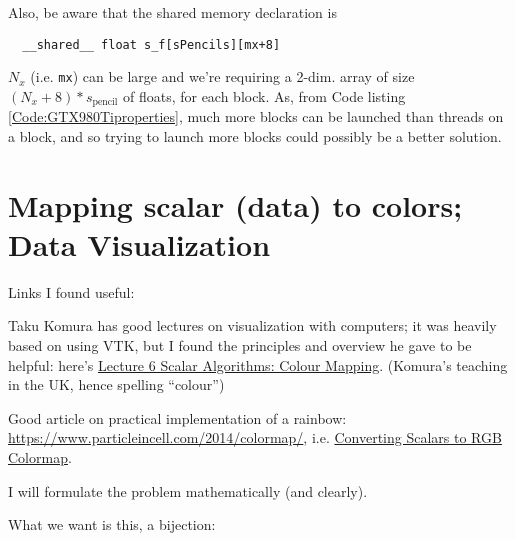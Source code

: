 \documentclass[10pt]{amsart}
\begin{document}
\begin{multicols*}{2}
Also, be aware that the shared memory declaration is
\begin{lstlisting}
  __shared__ float s_f[sPencils][mx+8]
\end{lstlisting}

$N_x$ (i.e. \verb|mx|) can be large and we're requiring a 2-dim. array of size $(N_x+8)*s_{\text{pencil}}$ of floats, for each block.  As, from Code listing \ref{Code:GTX980Tiproperties}, much more blocks can be launched than threads on a block, and so trying to launch more blocks could possibly be a better solution.  



\pagebreak

\section{Mapping scalar (data) to colors; Data Visualization}

Links I found useful:

Taku Komura has good lectures on visualization with computers; it was heavily based on using VTK, but I found the principles and overview he gave to be helpful: here's \href{http://www.inf.ed.ac.uk/teaching/courses/vis/lecture_notes/lecture6.pdf}{Lecture 6 Scalar Algorithms: Colour Mapping}.  (Komura's teaching in the UK, hence spelling ``colour'')

Good article on practical implementation of a rainbow: \url{https://www.particleincell.com/2014/colormap/}, i.e. \href{https://www.particleincell.com/2014/colormap/}{Converting Scalars to RGB Colormap}.

I will formulate the problem mathematically (and clearly).

What we want is this, a bijection:


\end{multicols*}
\end{document}
